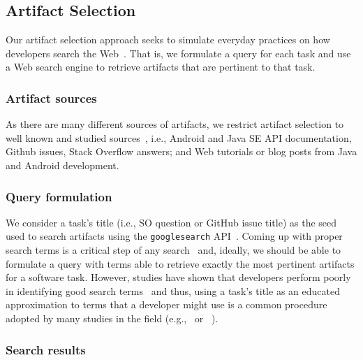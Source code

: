 \subsection{Artifact Selection}
\label{cp4:corpus-artifacts}


Our artifact selection approach seeks to simulate everyday practices on how developers search the Web~\cite{rao2020, Xia2017}. That is, we formulate a query for each task and use a Web search engine to retrieve artifacts that are pertinent to that task.


\subsubsection{Artifact sources}

As there are many different sources of artifacts, we restrict artifact selection to well known and studied sources~\cite{Starke2009,Kevic2014, Li2013}, i.e.,
Android and Java SE API documentation, Github issues, Stack Overflow answers; and Web tutorials or blog posts from Java and Android development.



\subsubsection{Query formulation}



We consider a task's title (i.e., SO question or GitHub issue title) as the seed used to search artifacts
using the \texttt{googlesearch} API~\cite{googlesearch}.
Coming up with proper search terms is a critical step of any search~\cite{Haiduc2013}
and, ideally, we should be able to formulate a query with terms able to retrieve exactly the most pertinent artifacts for a software task.
However, studies have shown that developers perform poorly in identifying good search terms~\cite{Starke2009,Kevic2014, Li2013} and thus, using a task's title
as an educated approximation to terms that a developer might use is a common procedure adopted by many studies in the field (e.g.,~\cite{Xu2017} or ~\cite{Silva2019}).







\subsubsection{Search results}



